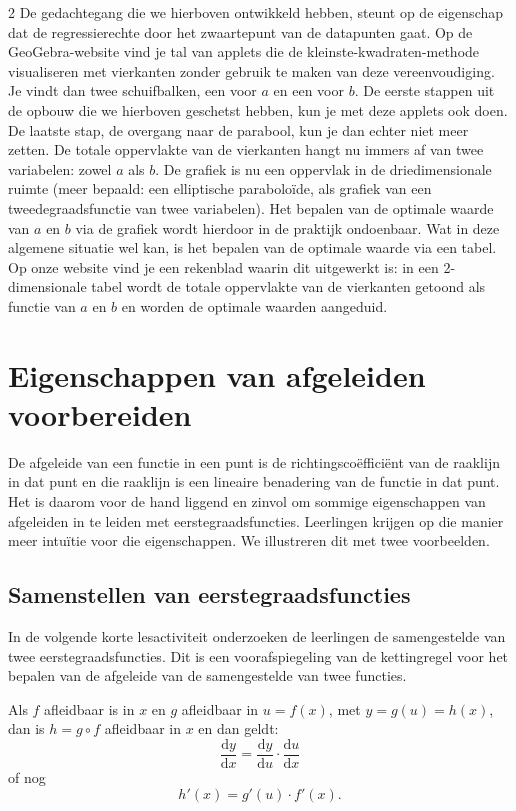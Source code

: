 \begin{multicols}{2}
De gedachtegang die we hierboven ontwikkeld hebben, steunt op de eigenschap dat de regressierechte door het zwaartepunt van de datapunten gaat. Op de GeoGebra-website vind je tal van applets die de kleinste-kwadraten-methode visualiseren met vierkanten zonder gebruik te maken van deze vereenvoudiging. Je vindt dan twee schuifbalken, een voor $a$ en een voor $b$. De eerste stappen uit de opbouw die we hierboven geschetst hebben, kun je met deze applets ook doen. De laatste stap, de overgang naar de parabool, kun je dan echter niet meer zetten. De totale oppervlakte van de vierkanten hangt nu immers af van twee variabelen: zowel $a$ als $b$. De grafiek is nu een oppervlak in de driedimensionale ruimte (meer bepaald: een elliptische paraboloïde, als grafiek van een tweedegraadsfunctie van twee variabelen). Het bepalen van de optimale waarde van $a$ en $b$ via de grafiek wordt hierdoor in de praktijk ondoenbaar. Wat in deze algemene situatie wel kan, is het bepalen van de optimale waarde via een tabel. Op onze website vind je een rekenblad waarin dit uitgewerkt is: in een 2-dimensionale tabel wordt de totale oppervlakte van de vierkanten getoond als functie van $a$ en $b$ en worden de optimale waarden aangeduid.



\section{Eigenschappen van afgeleiden voorbereiden}
De afgeleide van een functie in een punt is de richtingscoëfficiënt van de raaklijn in dat punt en die raaklijn is een lineaire benadering van de functie in dat punt. Het is daarom voor de hand liggend en zinvol om sommige eigenschappen van afgeleiden in te leiden met eerstegraadsfuncties. Leerlingen krijgen op die manier meer intuïtie voor die eigenschappen. We illustreren dit met twee voorbeelden.


\subsection{Samenstellen van eerstegraadsfuncties}

In de volgende korte lesactiviteit onderzoeken de leerlingen de samengestelde van twee eerstegraadsfuncties. Dit is een voorafspiegeling van de kettingregel voor het bepalen van de afgeleide van de samengestelde van twee functies. 

Als $f$ afleidbaar is in $x$ en $g$ afleidbaar in $u=f(x)$, met $y=g(u)=h(x)$, dan is $h=g \circ f$ afleidbaar in $x$ en dan geldt: $$\frac{\mathrm{d}y}{\mathrm{d}x}=\frac{\mathrm{d}y}{\mathrm{d}u}\cdot \frac{\mathrm{d}u}{\mathrm{d}x}$$ of nog $$h'(x)=g'(u)\cdot f'(x).$$


\end{multicols}

